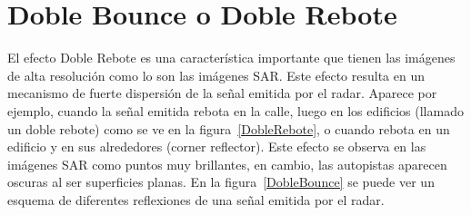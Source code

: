 \section{Doble Bounce o Doble Rebote}
\label{SecDobleBounce}
El efecto Doble Rebote es una característica importante que tienen las  imágenes de alta resolución como lo son las imágenes SAR. 
Este efecto resulta en un mecanismo de fuerte dispersión de la señal emitida por el radar. 
Aparece por ejemplo, cuando la señal emitida rebota en la calle, luego en los edificios (llamado un doble rebote) como se ve en la figura~\ref{DobleRebote}, o cuando rebota en un edificio y en sus alrededores (corner reflector).  Este efecto se observa en las imágenes SAR como puntos muy brillantes, en cambio, las autopistas aparecen oscuras al ser superficies planas. En la figura~\ref{DobleBounce} se puede ver un esquema de diferentes reflexiones de una señal emitida por el radar.
